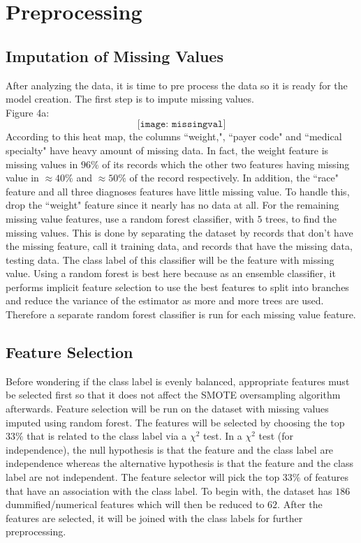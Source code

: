 \documentclass{article}
\begin{document}
\section{Preprocessing}
\subsection{Imputation of Missing Values}
After analyzing the data, it is time to pre process the data so it is ready for the model creation. The first step is to impute missing values. \\
Figure 4a: $$ \texttt{[image: missingval]} $$ 
According to this heat map, the columns ``weight,", ``payer code" and ``medical specialty"  have heavy amount of missing data. In fact, the weight feature is missing values in $96\%$ of its records which the other two features having missing value in $\approx 40\%$ and $\approx 50\%$ of the record respectively. In addition, the ``race" feature and all three diagnoses features have little missing value. To handle this, drop the ``weight" feature since it nearly has no data at all. For the remaining missing value features, use a random forest classifier, with $5$ trees, to find the missing values. This is done by separating the dataset by records that don't have the missing feature, call it training data, and records that have the missing data, testing data. The class label of this classifier will be the feature with missing value. Using a random forest is best here because as an ensemble classifier, it performs implicit feature selection to use the best features to split into branches and reduce the variance of the estimator as more and more trees are used. Therefore a separate random forest classifier is run for each missing value feature. 

\subsection{Feature Selection}
Before wondering if the class label is evenly balanced, appropriate features must be selected first so that it does not affect the SMOTE oversampling algorithm afterwards. Feature selection will be run on the dataset with missing values imputed using random forest. The features will be selected by choosing the top $33\%$ that is related to the class label via a $\chi^2$ test. In a $\chi^2$ test (for independence), the null hypothesis is that the feature and the class label are independence whereas the alternative hypothesis is that the feature and the class label are not independent. The feature selector will pick the top $33\%$ of features that have an association with the class label. To begin with, the dataset has $186$ dummified/numerical features which will then be reduced to $62$. After the features are selected, it will be joined with the class labels for further preprocessing.
\end{document}
